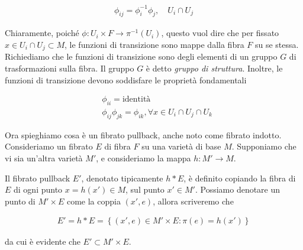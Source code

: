 \documentclass{report}
\begin{document}
\begin{align}
    \phi_{ij} = \phi_i^{-1}\phi_j, \quad U_i \cap U_j
\end{align}

Chiaramente, poiché \(\phi: U_i \times F \rightarrow \pi^{-1}(U_i)\), questo vuol dire che per fissato \(x \in U_i \cap U_j \subset M\), le funzioni di transizione sono mappe dalla fibra \(F\) su se stessa. Richiediamo che le funzioni di transizione sono degli elementi di un gruppo \(G\) di trasformazioni sulla fibra. Il gruppo \(G\) è detto \emph{gruppo di struttura}. Inoltre, le funzioni di transizione devono soddisfare le proprietà fondamentali

\begin{align}
    &\phi_{ii} = \text{identità}  \\
    &\phi_{ij}\phi_{jk} = \phi_{ik}, \forall x \in U_i \cap U_j \cap U_k
\end{align}

Ora spieghiamo cosa è un fibrato pullback, anche noto come fibrato indotto. Consideriamo un fibrato \(E\) di fibra \(F\) su una varietà di base \(M\). Supponiamo che vi sia un'altra varietà \(M'\), e consideriamo la mappa \(h: M' \rightarrow M\). 

Il fibrato pullback \(E'\), denotato tipicamente \(h*E\), è definito copiando la fibra di \(E\) di ogni punto \(x = h(x') \in M\), sul punto \(x' \in M'\). Possiamo denotare un punto di \(M' \times E\) come la coppia \((x', e)\), allora scriveremo che 

\begin{align}
    E' = h*E = \left\{(x', e)\in M' \times E : \pi(e) = h(x')\right\}
\end{align}

da cui è evidente che \(E' \subset M' \times E\). 

\end{document}
